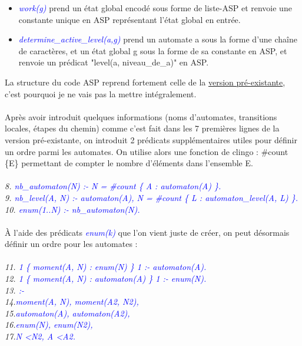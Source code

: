 \documentclass[10pt,a4paper]{article}
\begin{document}
\begin{itemize}
	\item\emph{\textcolor{blue}{work(g)}} prend un état global encodé sous forme de liste-ASP et renvoie une constante unique en ASP représentant l'état global en entrée.\\
	\item\emph{\textcolor{blue}{determine\_active\_level(a,g)}} prend un automate a sous la forme d'une chaîne de caractères, et un état global g sous la forme de sa constante en ASP, et renvoie un prédicat "level(a, 	
	niveau\_de\_a)" en ASP.
\end{itemize}
La structure du code ASP reprend fortement celle de la \hyperlink{preexistante}{version pré-existante}, c'est pourquoi je ne vais pas la mettre intégralement.\\ \\
Après avoir introduit quelques informations (noms d'automates, transitions locales, étapes du chemin) comme c'est fait dans les 7 premières lignes de la version pré-existante, on introduit 2 prédicats supplémentaires utiles pour 
définir un ordre parmi les automates. On utilise alors une fonction de clingo : \#count \{E\} permettant de compter le nombre d'éléments dans l'ensemble E.\\ \\
\emph{
	8. \textcolor{blue}{nb\_automaton(N) :- N = \#count \{ A : automaton(A) \}.}\\
	9. \textcolor{blue}{nb\_level(A, N) :- automaton(A), N = \#count \{ L : automaton\_level(A, L) \}.}\\
	10. \textcolor{blue}{enum(1..N) :- nb\_automaton(N).}\\ \\
}
\`A l'aide des prédicats \emph{\textcolor{blue}{enum(k)}} que l'on vient juste de créer, on peut désormais définir un ordre pour les automates :\\ \\
\emph{
	11. \textcolor{blue}{1 \{ moment(A, N) : enum(N) \} 1 :- automaton(A).}\\
	12. \textcolor{blue}{1 \{ moment(A, N) : automaton(A) \} 1 :- enum(N).}\\
	13. \textcolor{blue}{:- }\\
	14.\qquad\textcolor{blue}{moment(A, N), moment(A2, N2),}\\
	15.\qquad\textcolor{blue}{automaton(A), automaton(A2),}\\
	16.\qquad\textcolor{blue}{enum(N), enum(N2),}\\
	17.\qquad\textcolor{blue}{N \textless N2, A \textless A2.}\\ \\
}
\end{document}
